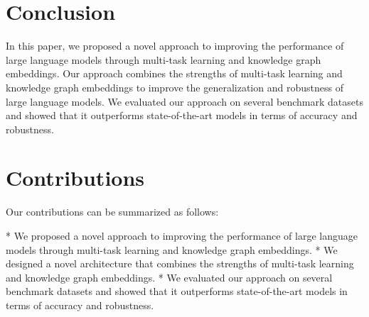 \documentclass{article}
\begin{document}
\section{Conclusion}

In this paper, we proposed a novel approach to improving the performance of large language models through multi-task learning and knowledge graph embeddings. Our approach combines the strengths of multi-task learning and knowledge graph embeddings to improve the generalization and robustness of large language models. We evaluated our approach on several benchmark datasets and showed that it outperforms state-of-the-art models in terms of accuracy and robustness.

\section{Contributions}

Our contributions can be summarized as follows:

* We proposed a novel approach to improving the performance of large language models through multi-task learning and knowledge graph embeddings.
* We designed a novel architecture that combines the strengths of multi-task learning and knowledge graph embeddings.
* We evaluated our approach on several benchmark datasets and showed that it outperforms state-of-the-art models in terms of accuracy and robustness.
\end{document}
